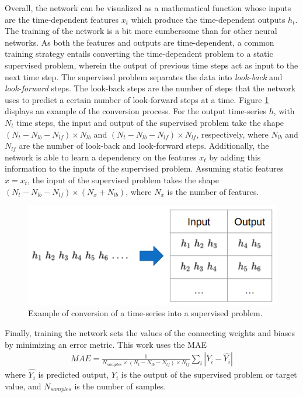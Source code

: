 Overall, the network can be visualized as a mathematical function whose inputs are the time-dependent features $x_t$ which produce the time-dependent outputs $h_t$.
The training of the network is a bit more cumbersome than for other neural networks.
As both the features and outputs are time-dependent, a common training strategy entails converting the time-dependent problem to a static supervised problem, wherein the output of previous time steps act as input to the next time step.
The supervised problem separates the data into \textit{look-back} and \textit{look-forward} steps.
The look-back steps are the number of steps that the network uses to predict a certain number of look-forward steps at a time.
Figure \ref{fig:lstm-convert} displays an example of the conversion process.
For the output time-series $h$, with $N_t$ time steps, the input and output of the supervised problem take the shape $(N_t-N_{lb}-N_{lf}) \times N_{lb}$ and $(N_t-N_{lb}-N_{lf}) \times N_{lf}$, respectively, where $N_{lb}$ and $N_{lf}$ are the number of look-back and look-forward steps.
Additionally, the network is able to learn a dependency on the features $x_t$ by adding this information to the inputs of the supervised problem.
Assuming static features $x = x_t$, the input of the supervised problem takes the shape $(N_t-N_{lb}-N_{lf}) \times (N_x + N_{lb})$, where $N_x$ is the number of features.

\begin{figure}[htbp!] %
  \centering
  \includegraphics[width=0.50\linewidth]{figures/lstm_convert}
  \hfill
  \caption{Example of conversion of a time-series into a supervised problem.}
  \label{fig:lstm-convert}
\end{figure}

Finally, training the network sets the values of the connecting weights and biases by minimizing an error metric.
This work uses the \gls*{MAE}
\begin{align}
MAE = \frac{1}{N_{samples} \times (N_t-N_{lb}-N_{lf}) \times N_{lf}} \sum_i | Y_i - \hat{Y_i} | \label{eq-MAE}
\end{align}
where $\hat{Y_i}$ is predicted output, $Y_i$ is the output of the supervised problem or target value, and $N_{samples}$ is the number of samples.


